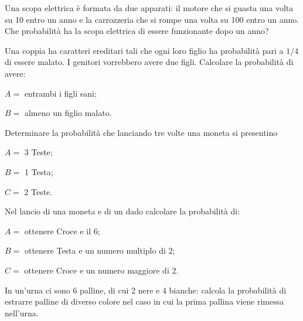 \begin{esercizio}[\Ast]
 \label{ese:9.53}
Una scopa elettrica è formata da due apparati: il motore che si guasta una volta su 10 entro un anno e la carrozzeria che si rompe una volta su 100 entro un anno. Che probabilità ha la scopa elettrica di essere funzionante dopo un anno?
\end{esercizio}

\begin{esercizio}[\Ast]
 \label{ese:9.54}
Una coppia ha caratteri ereditari tali che ogni loro figlio ha probabilità pari a $1/4$ di essere malato. I genitori vorrebbero avere due figli. Calcolare la probabilità di avere:
\begin{multicols}{2}
\begin{description*}
\item $ A= $ entrambi i figli sani;
\item $ B= $ almeno un figlio malato.
\end{description*}
\end{multicols}
\end{esercizio}

\begin{esercizio}[\Ast]
 \label{ese:9.55}
Determinare la probabilità che lanciando tre volte una moneta si presentino
\begin{multicols}{3}
\begin{description*}
\item $ A= $ 3 Teste;
\item $ B= $ 1 Testa;
\item $ C= $ 2 Teste.
\end{description*}
\end{multicols}
\end{esercizio}

\begin{esercizio}[\Ast]
 \label{ese:9.56}
Nel lancio di una moneta e di un dado calcolare la probabilità di:
\begin{description*}
\item $ A= $ ottenere Croce e il 6;
\item $ B= $ ottenere Testa e un numero multiplo di 2;
\item $ C= $ ottenere Croce e un numero maggiore di 2.
\end{description*}
\end{esercizio}

\begin{esercizio}[\Ast]
 \label{ese:9.57}
In un'urna ci sono 6 palline, di cui 2 nere e 4 bianche: calcola la probabilità di estrarre palline di diverso colore nel caso in cui la prima pallina viene rimessa nell'urna.
\end{esercizio}

